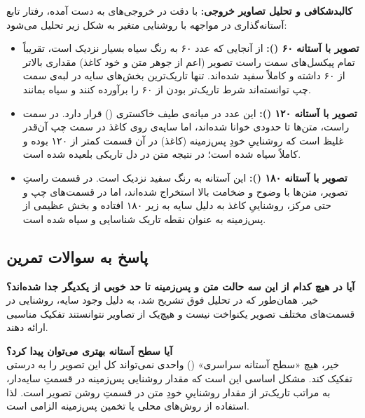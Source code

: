 \textbf{کالبدشکافی و تحلیل تصاویر خروجی:}
با دقت در خروجی‌های به دست آمده، رفتار تابع آستانه‌گذاری در مواجهه با روشنایی متغیر به شکل زیر تحلیل می‌شود:
\begin{itemize}
    \item \textbf{تصویر با آستانه ۶۰ ():} از آنجایی که عدد ۶۰ به رنگ سیاه بسیار نزدیک است، تقریباً تمام پیکسل‌های سمت راست تصویر (اعم از جوهر متن و خود کاغذ) مقداری بالاتر از ۶۰ داشته و کاملاً سفید شده‌اند. تنها تاریک‌ترین بخش‌های سایه در لبه‌ی سمت چپ توانسته‌اند شرط تاریک‌تر بودن از ۶۰ را برآورده کنند و سیاه بمانند.
    \item \textbf{تصویر با آستانه ۱۲۰ ():} این عدد در میانه‌ی طیف خاکستری () قرار دارد. در سمت راست، متن‌ها تا حدودی خوانا شده‌اند، اما سایه‌ی روی کاغذ در سمت چپ آن‌قدر غلیظ است که روشناییِ خودِ پس‌زمینه (کاغذ) در آن قسمت کمتر از ۱۲۰ بوده و کاملاً سیاه شده است؛ در نتیجه متن در دل تاریکی بلعیده شده است.
    \item \textbf{تصویر با آستانه ۱۸۰ ():} این آستانه به رنگ سفید نزدیک است. در قسمت راستِ تصویر، متن‌ها با وضوح و ضخامت بالا استخراج شده‌اند، اما در قسمت‌های چپ و حتی مرکز، روشناییِ کاغذ به دلیل سایه به زیر ۱۸۰ افتاده و بخش عظیمی از پس‌زمینه به عنوان نقطه تاریک شناسایی و سیاه شده است.
\end{itemize}

\subsection{پاسخ به سوالات تمرین}
\textbf{آیا در هیچ کدام از این سه حالت متن و پس‌زمینه تا حد خوبی از یکدیگر جدا شده‌اند؟} \\
خیر. همان‌طور که در تحلیل فوق تشریح شد، به دلیل وجود سایه، روشنایی در قسمت‌های مختلف تصویر یکنواخت نیست و هیچ‌یک از تصاویر نتوانستند تفکیک مناسبی ارائه دهند.

\textbf{آیا سطح آستانه بهتری می‌توان پیدا کرد؟} \\
خیر، هیچ «سطح آستانه سراسری» () واحدی نمی‌تواند کل این تصویر را به درستی تفکیک کند. مشکل اساسی این است که مقدار روشنایی پس‌زمینه در قسمتِ سایه‌دار، به مراتب تاریک‌تر از مقدار روشناییِ خودِ متن در قسمتِ روشن تصویر است. لذا استفاده از روش‌های محلی یا تخمین پس‌زمینه الزامی است.
